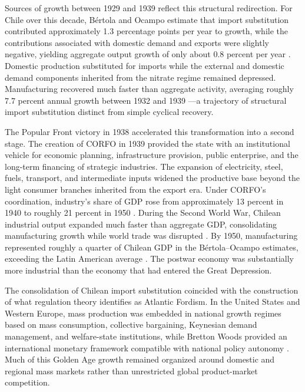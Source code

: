 Sources of growth between 1929 and 1939 reflect this structural redirection. For Chile over this decade, B\'ertola and Ocampo estimate that import substitution contributed approximately 1.3 percentage points per year to growth, while the contributions associated with domestic demand and exports were slightly negative, yielding aggregate output growth of only about 0.8 percent per year \citep{BertolaOcampo2012}. Domestic production substituted for imports while the external and domestic demand components inherited from the nitrate regime remained depressed. Manufacturing recovered much faster than aggregate activity, averaging roughly 7.7 percent annual growth between 1932 and 1939 \citep{BulmerThomas2003}---a trajectory of structural import substitution distinct from simple cyclical recovery.

The Popular Front victory in 1938 accelerated this transformation into a second stage. The creation of CORFO in 1939 provided the state with an institutional vehicle for economic planning, infrastructure provision, public enterprise, and the long-term financing of strategic industries. The expansion of electricity, steel, fuels, transport, and intermediate inputs widened the productive base beyond the light consumer branches inherited from the export era. Under CORFO's coordination, industry's share of GDP rose from approximately 13 percent in 1940 to roughly 21 percent in 1950 \citep{Silva2007}. During the Second World War, Chilean industrial output expanded much faster than aggregate GDP, consolidating manufacturing growth while world trade was disrupted \citep{BulmerThomas2003}. By 1950, manufacturing represented roughly a quarter of Chilean GDP in the B\'ertola--Ocampo estimates, exceeding the Latin American average \citep{BertolaOcampo2012}. The postwar economy was substantially more industrial than the economy that had entered the Great Depression.

The consolidation of Chilean import substitution coincided with the construction of what regulation theory identifies as Atlantic Fordism. In the United States and Western Europe, mass production was embedded in national growth regimes based on mass consumption, collective bargaining, Keynesian demand management, and welfare-state institutions, while Bretton Woods provided an international monetary framework compatible with national policy autonomy \citep{Vidal2015,Vidal2019}. Much of this Golden Age growth remained organized around domestic and regional mass markets rather than unrestricted global product-market competition.

